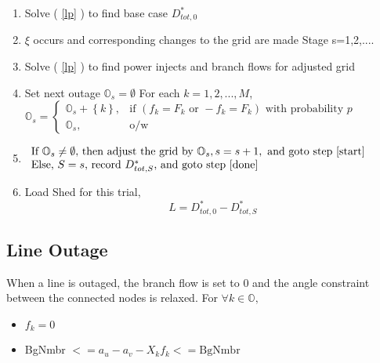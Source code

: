 \begin{enumerate}
\item Solve ( \ref{lp} ) to find base case $D_{tot,0}^*$
\item $\xi$ occurs and corresponding changes to the grid are made \newline
\newline Stage s=1,2,....
\item \label{start} Solve ( \ref{lp} ) to find power injects and branch flows for adjusted grid
\item Set next outage $\mathbb{O}_s = \emptyset$ \newline
For each $k = 1,2,...,M$,   \newline 
 $\mathbb{O}_s = 
 \left\{ 
	\begin{array}{lr}
				\mathbb{O}_s + \left\{ k \right\}, & \mbox{if } \left( f_k = F_k \mbox{ or } -f_k = F_k \right)  \mbox{ with probability } p \\
			  \mathbb{O}_s, & \mbox{o/w }
	\end{array}
 \right. $ 
\item $
	\begin{array}{lr}
				\mbox{If }  \mathbb{O}_s \neq \emptyset \mbox{, then adjust the grid by } \mathbb{O}_s , s=s+1, \mbox{ and goto step \ref{start}} \\
			  \mbox{Else, } S=s \mbox{, record } D_{tot,S}^* \mbox{, and goto step \ref{done}}
	\end{array} $
\item \label{done}	Load Shed for this trial, \newline
\begin{equation} \label{ls}
 L = D_{tot,0}^* - D_{tot,S}^* 
\end{equation}		
\end{enumerate}



\subsection{Line Outage}
When a line is outaged, the branch flow is set to 0 and the angle constraint between the connected nodes is relaxed. \newline
\newline
	For $\forall k \in \mathbb{O}, $
	\begin{itemize}
	\item	 $ f_k = 0 $
	 \item BgNmbr $ <= a_u - a_v - X_k f_k <= \mbox{BgNmbr} $ 
  \end{itemize}


